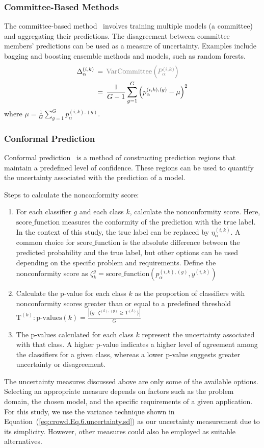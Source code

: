 \documentclass[sn-nature]{bst/sn-jnl}
\begin{document}
\subsubsection{Committee-Based Methods}
The committee-based method~\cite{wang_Wisdom_2020} involves training multiple models (a committee) and aggregating their predictions. The disagreement between committee members' predictions can be used as a measure of uncertainty. Examples include bagging and boosting ensemble methods and models, such as random forests.
\begin{align}
    \Delta_{\alpha}^{(i,k)}
    \, & = \, \textcolor{gray}{\mathrm{VarCommittee}\left(P_{\alpha}^{(i,k)}\right)} \\
    \, & = \, \frac{1}{G-1} \sum_{g=1}^G {\left(p_{\alpha}^{(i,k),(g)}-\mu\right)}^{2}
    \label{eq:crowd.Eq.8.uncertainty.committee_based}
\end{align}
where $\mu= \frac{1}{G} \sum_{g=1}^G p_{\alpha}^{(i,k),(g)}$.
\subsubsection{Conformal Prediction}
Conformal prediction~\cite{angelopoulos_Gentle_2021} is a method of constructing prediction regions that maintain a predefined level of confidence. These regions can be used to quantify the uncertainty associated with the prediction of a model.

Steps  to calculate the nonconformity score:
\begin{enumerate}
    \item For each classifier $g $ and each class $k $, calculate the nonconformity score. Here, $\mathrm{score\_function}$ measures the conformity of the prediction with the true label. In the context of this study, the true label can be replaced by $\eta_{\alpha}^{(i,k)} $. A common choice for $\mathrm{score\_function}$ is the absolute difference between the predicted probability and the true label, but other options can be used depending on the specific problem and requirements. Define the nonconformity score as $ \zeta_{k}^{g} = \mathrm{score\_function} \left(p_{\alpha}^{(i,k),(g)}, y^{(i,k)}\right) $
    \item Calculate the p-value for each class $k $ as the proportion of classifiers with nonconformity scores greater than or equal to a predefined threshold $\text{T}^{(k)}: \text{p-values}(k) = \frac{ \left\vert \{g: \;\zeta^{(k),(g)} \geq \text{T}^{(k)} \} \right\vert} {G} $
    \item The p-values calculated for each class $k $ represent the uncertainty associated with that class. A higher p-value indicates a higher level of agreement among the classifiers for a given class, whereas a lower p-value suggests greater uncertainty or disagreement.
\end{enumerate}
The uncertainty measures discussed above are only some of the available options. Selecting an appropriate measure depends on factors such as the problem domain, the chosen model, and the specific requirements of a given application. For this study, we use the variance technique shown in Equation~(\ref{eq:crowd.Eq.6.uncertainty.sd}) as our uncertainty measurement due to its simplicity. However, other measures could also be employed as suitable alternatives.
\end{document}
